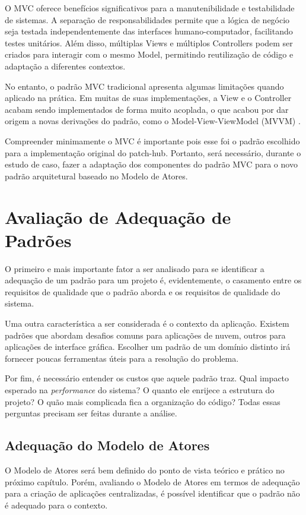 O MVC oferece benefícios significativos para a manutenibilidade e testabilidade de sistemas. A separação de responsabilidades permite que a lógica de negócio seja testada independentemente das interfaces humano-computador, facilitando testes unitários. Além disso, múltiplas Views e múltiplos Controllers podem ser criados para interagir com o mesmo Model, permitindo reutilização de código e adaptação a diferentes contextos.

No entanto, o padrão MVC tradicional apresenta algumas limitações quando aplicado na prática. Em muitas de suas implementações, a View e o Controller acabam sendo implementados de forma muito acoplada, o que acabou por dar origem a novas derivações do padrão, como o Model-View-ViewModel (MVVM) \citep{kouraklis2016mvvm}.

Compreender minimamente o MVC é importante pois esse foi o padrão escolhido para a implementação original do patch-hub. Portanto, será necessário, durante o estudo de caso, fazer a adaptação dos componentes do padrão MVC para o novo padrão arquitetural baseado no Modelo de Atores.


\section{Avaliação de Adequação de Padrões}

O primeiro e mais importante fator a ser analisado para se identificar a adequação de um padrão para um projeto é, evidentemente, o casamento entre os requisitos de qualidade que o padrão aborda e os requisitos de qualidade do sistema.

Uma outra característica a ser considerada é o contexto da aplicação. Existem padrões que abordam desafios comuns para aplicações de nuvem, outros para aplicações de interface gráfica. Escolher um padrão de um domínio distinto irá fornecer poucas ferramentas úteis para a resolução do problema.

Por fim, é necessário entender os custos que aquele padrão traz. Qual impacto esperado na \emph{performance} do sistema? O quanto ele enrijece a estrutura do projeto? O quão mais complicada fica a organização do código? Todas essas perguntas precisam ser feitas durante a análise.

\subsection{Adequação do Modelo de Atores}

O Modelo de Atores será bem definido do ponto de vista teórico e prático no próximo capítulo. Porém, avaliando o Modelo de Atores em termos de adequação para a criação de aplicações centralizadas, é possível identificar que o padrão não é adequado para o contexto.

